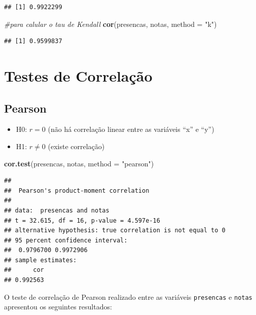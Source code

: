 \documentclass[
]{book}
\newenvironment{Shaded}{\begin{snugshade}}{\end{snugshade}}
\newcommand{\AttributeTok}[1]{\textcolor[rgb]{0.13,0.29,0.53}{#1}}
\newcommand{\CommentTok}[1]{\textcolor[rgb]{0.56,0.35,0.01}{\textit{#1}}}
\newcommand{\FunctionTok}[1]{\textcolor[rgb]{0.13,0.29,0.53}{\textbf{#1}}}
\newcommand{\NormalTok}[1]{#1}
\newcommand{\StringTok}[1]{\textcolor[rgb]{0.31,0.60,0.02}{#1}}
\providecommand{\tightlist}{%
  \setlength{\itemsep}{0pt}\setlength{\parskip}{0pt}}
\begin{document}
\begin{verbatim}
## [1] 0.9922299
\end{verbatim}

\begin{Shaded}
\begin{Highlighting}[]
\CommentTok{\#para calular o tau de Kendall}
\FunctionTok{cor}\NormalTok{(presencas, notas, }\AttributeTok{method =} \StringTok{"k"}\NormalTok{)}
\end{Highlighting}
\end{Shaded}

\begin{verbatim}
## [1] 0.9599837
\end{verbatim}

\section{Testes de Correlação}\label{testes-de-correlauxe7uxe3o}

\subsection{Pearson}\label{pearson}

\begin{itemize}
\tightlist
\item
  H0: \(r = 0\) (não há correlação linear entre as variáveis ``x'' e ``y'')
\item
  H1: \(r \neq 0\) (existe correlação)
\end{itemize}

\begin{Shaded}
\begin{Highlighting}[]
\FunctionTok{cor.test}\NormalTok{(presencas, notas, }\AttributeTok{method =} \StringTok{"pearson"}\NormalTok{)}
\end{Highlighting}
\end{Shaded}

\begin{verbatim}
## 
##  Pearson's product-moment correlation
## 
## data:  presencas and notas
## t = 32.615, df = 16, p-value = 4.597e-16
## alternative hypothesis: true correlation is not equal to 0
## 95 percent confidence interval:
##  0.9796700 0.9972906
## sample estimates:
##      cor 
## 0.992563
\end{verbatim}

O teste de correlação de Pearson realizado entre as variáveis \texttt{presencas} e \texttt{notas} apresentou os seguintes resultados:
\end{document}
